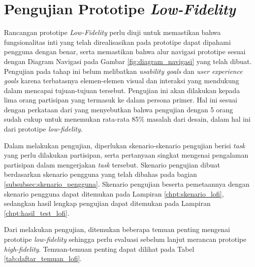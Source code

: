 \section{Pengujian Prototipe \textit{Low-Fidelity}}
Rancangan prototipe \textit{Low-Fidelity} perlu diuji untuk memastikan bahwa fungsionalitas inti yang telah direalisasikan pada prototipe dapat dipahami pengguna dengan benar, serta memastikan bahwa alur navigasi prototipe sesuai dengan Diagram Navigasi pada Gambar \ref{fig:diagram_navigasi} yang telah dibuat. Pengujian pada tahap ini belum melibatkan \textit{usability goals} dan \textit{user experience goals} karena terbatasnya elemen-elemen visual dan interaksi yang mendukung dalam mencapai tujuan-tujuan tersebut. Pengujian ini akan dilakukan kepada lima orang partisipan yang termasuk ke dalam persona primer. Hal ini sesuai dengan perkataan dari \textcite{nielsenusabilityproblems} yang menyebutkan bahwa pengujian dengan 5 orang sudah cukup untuk menemukan rata-rata 85\% masalah dari desain, dalam hal ini dari prototipe \textit{low-fidelity}.


Dalam melakukan pengujian, diperlukan skenario-skenario pengujian berisi \textit{task} yang perlu dilakukan partisipan, serta pertanyaan singkat mengenai pengalaman partisipan dalam mengerjakan \textit{task} tersebut. Skenario pengujian dibuat berdasarkan skenario pengguna yang telah dibahas pada bagian \ref{subsubsec:skenario_pengguna}. Skenario pengujian beserta pemetaannya dengan skenario pengguna dapat ditemukan pada Lampiran \ref{chpt:skenario_lofi}, sedangkan hasil lengkap pengujian dapat ditemukan pada Lampiran \ref{chpt:hasil_test_lofi}.

Dari melakukan pengujian, ditemukan beberapa temuan penting mengenai prototipe \textit{low-fidelity} sehingga perlu evaluasi sebelum lanjut merancan prototipe \textit{high-fidelity}. Temuan-temuan penting dapat dilihat pada Tabel \ref{tab:daftar_temuan_lofi}.

\newcommand{\cditem}[1]{\colorbox{white}{\raisebox{7pt}{\begin{minipage}[t]{0.8\textwidth}\linespread{1}\selectfont \begin{itemize}[parsep=0pt, leftmargin=*] #1 \end{itemize} \end{minipage}}}}

